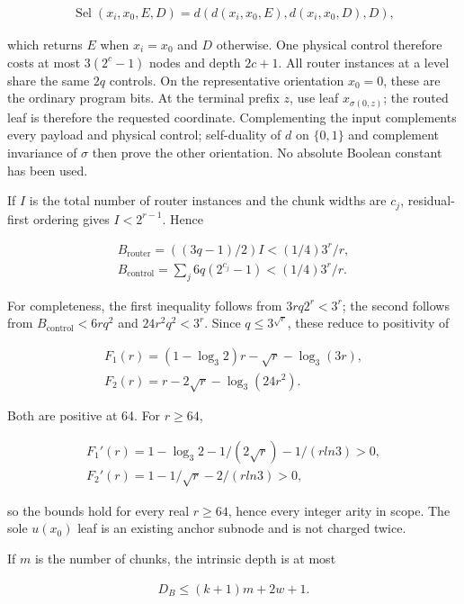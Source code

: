 \documentclass[
  11pt,
]{article}
\theoremstyle{definition}
\theoremstyle{remark}
\begin{document}
\[
\begin{aligned}
\operatorname{Sel}(x_i,x_0,E,D)=d(d(x_i,x_0,E),d(x_i,x_0,D),D),
\end{aligned}
\]

which returns \(E\) when \(x_i=x_0\) and \(D\) otherwise. One physical
control therefore costs at most \(3(2^c-1)\) nodes and depth \(2c+1\).
All router instances at a level share the same \(2q\) controls. On the
representative orientation \(x_0=0\), these are the ordinary program
bits. At the terminal prefix \(z\), use leaf \(x_{\sigma(0,z)}\); the
routed leaf is therefore the requested coordinate. Complementing the
input complements every payload and physical control; self-duality of
\(d\) on \(\{0,1\}\) and complement invariance of \(\sigma\) then prove
the other orientation. No absolute Boolean constant has been used.

If \(I\) is the total number of router instances and the chunk widths
are \(c_j\), residual-first ordering gives \(I<2^{r-1}\). Hence

\[
\begin{aligned}
B_{\mathrm{router}}  = ((3q-1)/2)I                 < (1/4)3^r/r, \\
B_{\mathrm{control}} = \sum_j 6q(2^{c_j}-1)         < (1/4)3^r/r.
\end{aligned}
\]

For completeness, the first inequality follows from \(3rq2^r<3^r\); the
second follows from \(B_{\mathrm{control}}<6rq^2\) and \(24r^2q^2<3^r\).
Since \(q\le 3^{\sqrt{r}}\), these reduce to positivity of

\[
\begin{aligned}
F_1(r)=(1-\log_3 2)r-\sqrt{r}-\log_3(3r), \\
F_2(r)=r-2\sqrt{r}-\log_3(24r^2).
\end{aligned}
\]

Both are positive at 64. For \(r\ge 64\),

\[
\begin{aligned}
F_1'(r)=1-\log_3 2-1/(2\sqrt{r})-1/(r ln 3)>0, \\
F_2'(r)=1-1/\sqrt{r}-2/(r ln 3)>0,
\end{aligned}
\]

so the bounds hold for every real \(r\ge 64\), hence every integer arity
in scope. The sole \(u(x_0)\) leaf is an existing anchor subnode and is
not charged twice.

If \(m\) is the number of chunks, the intrinsic depth is at most

\[
\begin{aligned}
D_B \le  (k+1)m+2w+1.
\end{aligned}
\]
\end{document}
